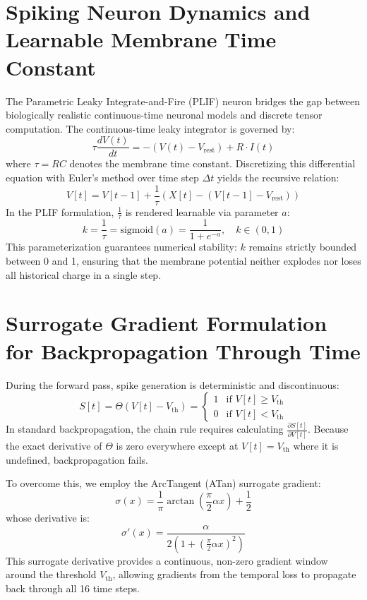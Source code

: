 \documentclass[12pt,a4paper]{report}
\begin{document}
\section{Spiking Neuron Dynamics and Learnable Membrane Time Constant}
The Parametric Leaky Integrate-and-Fire (PLIF) neuron bridges the gap between biologically realistic continuous-time neuronal models and discrete tensor computation. The continuous-time leaky integrator is governed by:
\begin{equation}
    \tau \frac{dV(t)}{dt} = -(V(t) - V_{\text{rest}}) + R \cdot I(t)
\end{equation}
where $\tau = RC$ denotes the membrane time constant. Discretizing this differential equation with Euler's method over time step $\Delta t$ yields the recursive relation:
\begin{equation}
    V[t] = V[t-1] + \frac{1}{\tau} \left( X[t] - (V[t-1] - V_{\text{rest}}) \right)
\end{equation}
In the PLIF formulation, $\frac{1}{\tau}$ is rendered learnable via parameter $a$:
\begin{equation}
    k = \frac{1}{\tau} = \text{sigmoid}(a) = \frac{1}{1 + e^{-a}}, \quad k \in (0, 1)
\end{equation}
This parameterization guarantees numerical stability: $k$ remains strictly bounded between 0 and 1, ensuring that the membrane potential neither explodes nor loses all historical charge in a single step.

\section{Surrogate Gradient Formulation for Backpropagation Through Time}
During the forward pass, spike generation is deterministic and discontinuous:
\begin{equation}
    S[t] = \Theta(V[t] - V_{\text{th}}) = 
    \begin{cases} 
      1 & \text{if } V[t] \ge V_{\text{th}} \\ 
      0 & \text{if } V[t] < V_{\text{th}} 
   \end{cases}
\end{equation}
In standard backpropagation, the chain rule requires calculating $\frac{\partial S[t]}{\partial V[t]}$. Because the exact derivative of $\Theta$ is zero everywhere except at $V[t] = V_{\text{th}}$ where it is undefined, backpropagation fails.

To overcome this, we employ the ArcTangent (ATan) surrogate gradient:
\begin{equation}
    \sigma(x) = \frac{1}{\pi} \arctan\left(\frac{\pi}{2} \alpha x\right) + \frac{1}{2}
\end{equation}
whose derivative is:
\begin{equation}
    \sigma'(x) = \frac{\alpha}{2 (1 + (\frac{\pi}{2} \alpha x)^2)}
\end{equation}
This surrogate derivative provides a continuous, non-zero gradient window around the threshold $V_{\text{th}}$, allowing gradients from the temporal loss to propagate back through all 16 time steps.
\end{document}
